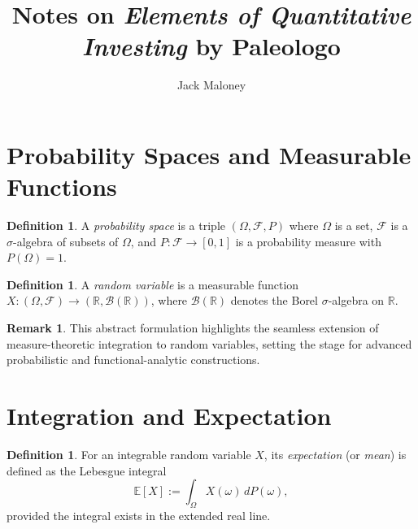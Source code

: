 \documentclass[11pt]{amsart}
\theoremstyle{definition}
\newtheorem{definition}[theorem]{Definition}
\newtheorem{remark}[theorem]{Remark}
\theoremstyle{remark}
\begin{document}
\title{Notes on \textit{Elements of Quantitative Investing} by Paleologo}
\author{Jack Maloney}


\maketitle

\section{Probability Spaces and Measurable Functions}

\begin{definition}
A \emph{probability space} is a triple $(\Omega, \mathcal{F}, P)$ where $\Omega$ is a set, $\mathcal{F}$ is a $\sigma$-algebra of subsets of $\Omega$, and $P: \mathcal{F} \to [0,1]$ is a probability measure with $P(\Omega) = 1$.
\end{definition}

\begin{definition}
A \emph{random variable} is a measurable function $X: (\Omega, \mathcal{F}) \to (\mathbb{R}, \mathcal{B}(\mathbb{R}))$, where $\mathcal{B}(\mathbb{R})$ denotes the Borel $\sigma$-algebra on $\mathbb{R}$.
\end{definition}

\begin{remark}
This abstract formulation highlights the seamless extension of measure-theoretic integration to random variables, setting the stage for advanced probabilistic and functional-analytic constructions.
\end{remark}

\section{Integration and Expectation}

\begin{definition}
For an integrable random variable $X$, its \emph{expectation} (or \emph{mean}) is defined as the Lebesgue integral
\[
\mathbb{E}[X] := \int_\Omega X(\omega) \, dP(\omega),
\]
provided the integral exists in the extended real line.
\end{definition}
\end{document}
